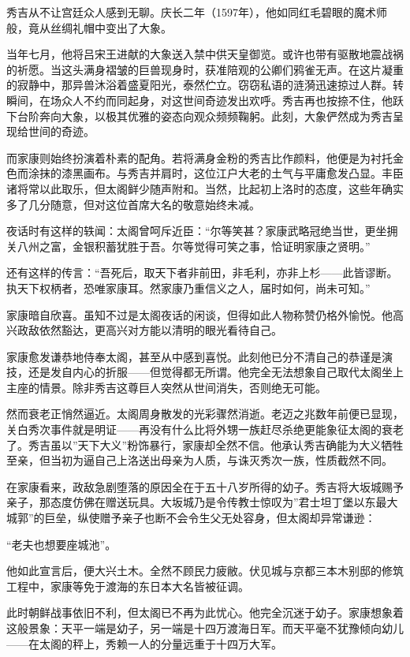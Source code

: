 \documentclass[
]{article}
\begin{document}
秀吉从不让宫廷众人感到无聊。庆长二年（1597年），他如同红毛碧眼的魔术师般，竟从丝绸礼帽中变出了大象。

当年七月，他将吕宋王进献的大象送入禁中供天皇御览。或许也带有驱散地震战祸的祈愿。当这头满身褶皱的巨兽现身时，获准陪观的公卿们鸦雀无声。在这片凝重的寂静中，那异兽沐浴着盛夏阳光，泰然伫立。窃窃私语的涟漪迅速掠过人群。转瞬间，在场众人不约而同起身，对这世间奇迹发出欢呼。秀吉再也按捺不住，他跃下台阶奔向大象，以极其优雅的姿态向观众频频鞠躬。此刻，大象俨然成为秀吉呈现给世间的奇迹。

而家康则始终扮演着朴素的配角。若将满身金粉的秀吉比作颜料，他便是为衬托金色而涂抹的漆黑画布。与秀吉并肩时，这位江户大老的土气与平庸愈发凸显。丰臣诸将常以此取乐，但太阁鲜少随声附和。当然，比起初上洛时的态度，这些年确实多了几分随意，但对这位首席大名的敬意始终未减。

夜话时有这样的轶闻：太阁曾呵斥近臣：``尔等笑甚？家康武略冠绝当世，更坐拥关八州之富，金银积蓄犹胜于吾。尔等觉得可笑之事，恰证明家康之贤明。''

还有这样的传言：``吾死后，取天下者非前田，非毛利，亦非上杉------此皆谬断。执天下权柄者，恐唯家康耳。然家康乃重信义之人，届时如何，尚未可知。''

家康暗自欣喜。虽知不过是太阁夜话的闲谈，但得如此人物称赞仍格外愉悦。他高兴政敌依然豁达，更高兴对方能以清明的眼光看待自己。

家康愈发谦恭地侍奉太阁，甚至从中感到喜悦。此刻他已分不清自己的恭谨是演技，还是发自内心的折服------但觉得都无所谓。他完全无法想象自己取代太阁坐上主座的情景。除非秀吉这尊巨人突然从世间消失，否则绝无可能。

然而衰老正悄然逼近。太阁周身散发的光彩骤然消逝。老迈之兆数年前便已显现，关白秀次事件就是明证------再没有什么比将外甥一族赶尽杀绝更能象征太阁的衰老了。秀吉虽以''天下大义''粉饰暴行，家康却全然不信。他承认秀吉确能为大义牺牲至亲，但当初为逼自己上洛送出母亲为人质，与诛灭秀次一族，性质截然不同。

在家康看来，政敌急剧堕落的原因全在于五十八岁所得的幼子。秀吉将大坂城赐予亲子，那态度仿佛在赠送玩具。大坂城乃是令传教士惊叹为''君士坦丁堡以东最大城郭''的巨垒，纵使赠予亲子也断不会令生父无处容身，但太阁却异常谦逊：

``老夫也想要座城池''。

他如此宣言后，便大兴土木。全然不顾民力疲敝。伏见城与京都三本木别邸的修筑工程中，家康等免于渡海的东日本大名皆被征调。

此时朝鲜战事依旧不利，但太阁已不再为此忧心。他完全沉迷于幼子。家康想象着这般景象：天平一端是幼子，另一端是十四万渡海日军。而天平毫不犹豫倾向幼儿------在太阁的秤上，秀赖一人的分量远重于十四万大军。
\end{document}
